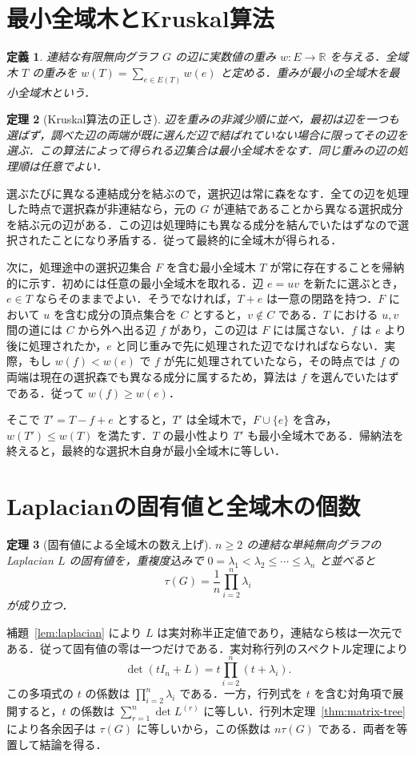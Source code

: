 \documentclass[a5paper,10pt,onecolumn]{jsarticle}
\makeatletter
\theoremstyle{mathnotetheorem}
\newtheorem{theorem}{定理}[section]
\newtheorem{definition}[theorem]{定義}
\renewcommand{\proofname}{証明}
\renewenvironment{proof}[1][\proofname]{%
  \par\pushQED{\qed}\normalfont\topsep4\p@\@plus2\p@\relax
  \trivlist\item[\hskip\labelsep\bfseries #1]\ignorespaces
}{\popQED\endtrivlist\@endpefalse}
\makeatother
\begin{document}
\section{最小全域木とKruskal算法}
\begin{definition}
連結な有限無向グラフ $G$ の辺に実数値の重み $w:E\to\mathbb R$ を与える．全域木 $T$ の重みを $w(T)=\sum_{e\in E(T)}w(e)$ と定める．重みが最小の全域木を\emph{最小全域木}という．
\end{definition}
\begin{theorem}[Kruskal算法の正しさ]\label{thm:kruskal}
辺を重みの非減少順に並べ，最初は辺を一つも選ばず，調べた辺の両端が既に選んだ辺で結ばれていない場合に限ってその辺を選ぶ．この算法によって得られる辺集合は最小全域木をなす．同じ重みの辺の処理順は任意でよい．
\end{theorem}
\begin{proof}
選ぶたびに異なる連結成分を結ぶので，選択辺は常に森をなす．全ての辺を処理した時点で選択森が非連結なら，元の $G$ が連結であることから異なる選択成分を結ぶ元の辺がある．この辺は処理時にも異なる成分を結んでいたはずなので選択されたことになり矛盾する．従って最終的に全域木が得られる．

次に，処理途中の選択辺集合 $F$ を含む最小全域木 $T$ が常に存在することを帰納的に示す．初めには任意の最小全域木を取れる．辺 $e=uv$ を新たに選ぶとき，$e\in T$ ならそのままでよい．そうでなければ，$T+e$ は一意の閉路を持つ．$F$ において $u$ を含む成分の頂点集合を $C$ とすると，$v\notin C$ である．$T$ における $u,v$ 間の道には $C$ から外へ出る辺 $f$ があり，この辺は $F$ には属さない．$f$ は $e$ より後に処理されたか，$e$ と同じ重みで先に処理された辺でなければならない．実際，もし $w(f)<w(e)$ で $f$ が先に処理されていたなら，その時点では $f$ の両端は現在の選択森でも異なる成分に属するため，算法は $f$ を選んでいたはずである．従って $w(f)\ge w(e)$．

そこで $T'=T-f+e$ とすると，$T'$ は全域木で，$F\cup\{e\}$ を含み，$w(T')\le w(T)$ を満たす．$T$ の最小性より $T'$ も最小全域木である．帰納法を終えると，最終的な選択木自身が最小全域木に等しい．
\end{proof}

\section{Laplacianの固有値と全域木の個数}
\begin{theorem}[固有値による全域木の数え上げ]\label{thm:lap-spectrum}
$n\ge2$ の連結な単純無向グラフのLaplacian $L$ の固有値を，重複度込みで
$0=\lambda_1<\lambda_2\le\cdots\le\lambda_n$ と並べると
\[
 \tau(G)=\frac1n\prod_{i=2}^n\lambda_i
\]
が成り立つ．
\end{theorem}
\begin{proof}
補題~\ref{lem:laplacian} により $L$ は実対称半正定値であり，連結なら核は一次元である．従って固有値の零は一つだけである．実対称行列のスペクトル定理により
\[
 \det(tI_n+L)=t\prod_{i=2}^n(t+\lambda_i).
\]
この多項式の $t$ の係数は $\prod_{i=2}^n\lambda_i$ である．一方，行列式を $t$ を含む対角項で展開すると，$t$ の係数は
$\sum_{r=1}^n\det L^{(r)}$ に等しい．行列木定理~\ref{thm:matrix-tree} により各余因子は $\tau(G)$ に等しいから，この係数は $n\tau(G)$ である．両者を等置して結論を得る．
\end{proof}
\end{document}
